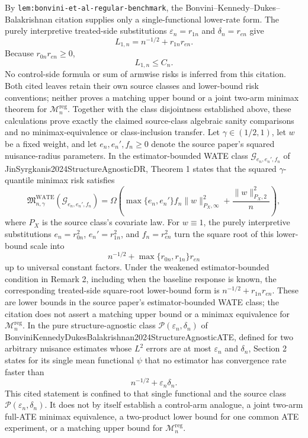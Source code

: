 By \texttt{lem:bonvini-et-al-regular-benchmark}, the Bonvini--Kennedy--Dukes--Balakrishnan citation supplies only a single-functional lower-rate form. The purely interpretive treated-side substitutions \(\varepsilon_n=r_{1n}\) and \(\delta_n=r_{en}\) give
\[
L_{1,n}=n^{-1/2}+r_{1n}r_{en}.
\]
Because \(r_{0n}r_{en}\ge0\),
\[
L_{1,n}\le C_n.
\]
No control-side formula or sum of armwise risks is inferred from this citation. Both cited leaves retain their own source classes and lower-bound risk conventions; neither proves a matching upper bound or a joint two-arm minimax theorem for \(\mathcal M_n^{\mathrm{reg}}\). Together with the class disjointness established above, these calculations prove exactly the claimed source-class algebraic sanity comparisons and no minimax-equivalence or class-inclusion transfer.
Let \(\gamma\in(1/2,1)\), let \(w\) be a fixed weight, and let \(e_n,e_n',f_n\ge0\) denote the source paper's squared nuisance-radius parameters.  In the estimator-bounded WATE class \(\mathcal G_{e_n,e_n',f_n}\) of JinSyrgkanis2024StructureAgnosticDR, Theorem 1 states that the squared \(\gamma\)-quantile minimax risk satisfies
\[
\mathfrak M_{n,\gamma}^{\mathrm{WATE}}(\mathcal G_{e_n,e_n',f_n})
=\Omega\!\left(
\max\{e_n,e_n'\}f_n\lVert w\rVert_{P_X,\infty}^{2}
+\frac{\lVert w\rVert_{P_X,2}^{2}}{n}
\right),
\]
where \(P_X\) is the source class's covariate law.  For \(w\equiv1\), the purely interpretive substitutions \(e_n=r_{0n}^{2}\), \(e_n'=r_{1n}^{2}\), and \(f_n=r_{en}^{2}\) turn the square root of this lower-bound scale into
\[
n^{-1/2}+\max\{r_{0n},r_{1n}\}r_{en}
\]
up to universal constant factors.  Under the weakened estimator-bounded condition in Remark 2, including when the baseline response is known, the corresponding treated-side square-root lower-bound form is \(n^{-1/2}+r_{1n}r_{en}\).  These are lower bounds in the source paper's estimator-bounded WATE class; the citation does not assert a matching upper bound or a minimax equivalence for \(\mathcal M_n^{\mathrm{reg}}\).
In the pure structure-agnostic class \(\mathcal P(\varepsilon_n,\delta_n)\) of BonviniKennedyDukesBalakrishnan2024StructureAgnosticATE, defined for two arbitrary nuisance estimates whose \(L^2\) errors are at most \(\varepsilon_n\) and \(\delta_n\), Section 2 states for its single mean functional \(\psi\) that no estimator has convergence rate faster than
\[
n^{-1/2}+\varepsilon_n\delta_n.
\]
This cited statement is confined to that single functional and the source class \(\mathcal P(\varepsilon_n,\delta_n)\). It does not by itself establish a control-arm analogue, a joint two-arm full-ATE minimax equivalence, a two-product lower bound for one common ATE experiment, or a matching upper bound for \(\mathcal M_n^{\mathrm{reg}}\).
